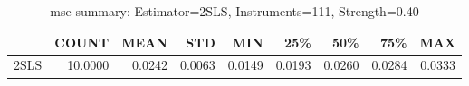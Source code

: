 \begin{table}[ht]
\centering
\caption{mse summary: Estimator=2SLS, Instruments=111, Strength=0.40}
\begin{tabular}{lrrrrrrrr}
\toprule
 & COUNT & MEAN & STD & MIN & 25\% & 50\% & 75\% & MAX \\
\midrule
2SLS & 10.0000 & 0.0242 & 0.0063 & 0.0149 & 0.0193 & 0.0260 & 0.0284 & 0.0333 \\
\bottomrule
\end{tabular}
\end{table}
